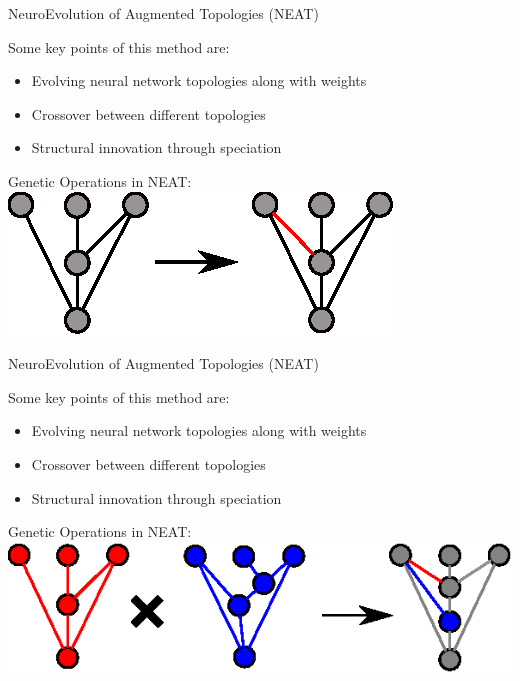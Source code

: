 \documentclass[6pt]{beamer}
\begin{document}
\begin{frame}{NeuroEvolution of Augmented Topologies (NEAT)~}
\begin{block}{Some key points of this method are:}
\begin{itemize}
\item Evolving neural network topologies along with weights
\item Crossover between different topologies
\item Structural innovation through speciation
\end{itemize}
\end{block}
\begin{block}{Genetic Operations in NEAT:}
\centering
\includegraphics[height=0.25\textheight]{../Figures/Misc/neatAddLink.eps}
\end{block}
\end{frame}

\begin{frame}{NeuroEvolution of Augmented Topologies (NEAT)~}
\begin{block}{Some key points of this method are:}
\begin{itemize}
\item Evolving neural network topologies along with weights
\item Crossover between different topologies
\item Structural innovation through speciation
\end{itemize}
\end{block}
\begin{block}{Genetic Operations in NEAT:}
\centering
\includegraphics[height=0.25\textheight]{../Figures/Misc/neatCrossOver.eps}
\end{block}
\end{frame}
\end{document}
